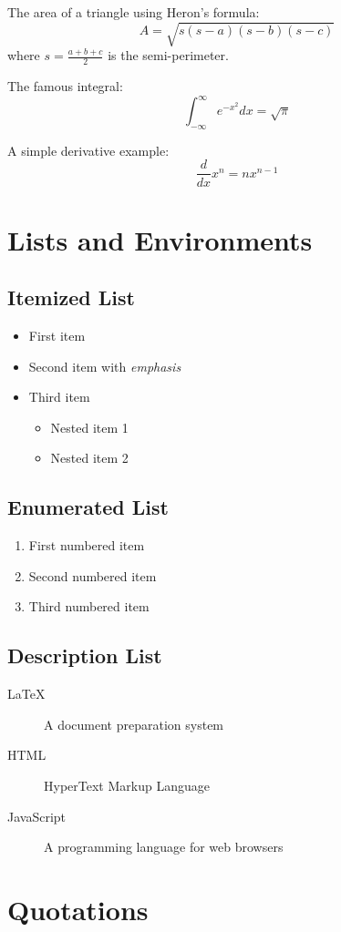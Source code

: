 \documentclass{article}
\begin{document}
The area of a triangle using Heron's formula:
\[
A = \sqrt{s(s-a)(s-b)(s-c)}
\]
where $s = \frac{a+b+c}{2}$ is the semi-perimeter.

The famous integral:
\[
\int_{-\infty}^{\infty} e^{-x^2} dx = \sqrt{\pi}
\]

A simple derivative example:
\[
\frac{d}{dx} x^n = nx^{n-1}
\]

\section{Lists and Environments}

\subsection{Itemized List}
\begin{itemize}
\item First item
\item Second item with \emph{emphasis}
\item Third item
    \begin{itemize}
    \item Nested item 1
    \item Nested item 2
    \end{itemize}
\end{itemize}

\subsection{Enumerated List}
\begin{enumerate}
\item First numbered item
\item Second numbered item
\item Third numbered item
\end{enumerate}

\subsection{Description List}
\begin{description}
\item[LaTeX] A document preparation system
\item[HTML] HyperText Markup Language
\item[JavaScript] A programming language for web browsers
\end{description}

\section{Quotations}
\end{document}
